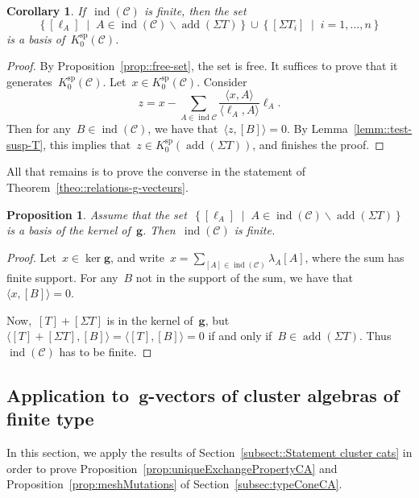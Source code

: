 \documentclass{amsart}
\newtheorem{corollary}[theorem]{Corollary}
\newtheorem{proposition}[theorem]{Proposition}
\theoremstyle{definition}
\renewcommand{\b}[1]{{\boldsymbol{#1}}} %
\newcommand{\set}[2]{\left\{ #1 \;\middle|\; #2 \right\}} %
\newcommand{\ssm}{\smallsetminus} %
\newcommand{\cat}{\mathcal{C}}
\newcommand{\susp}{\Sigma}
\newcommand{\add}{\operatorname{add}}
\newcommand{\spl}{\operatorname{sp}}
\newcommand{\Ksp}{K_0^{\spl}}
\newcommand{\ind}{\operatorname{ind}}
\begin{document}
\begin{corollary}
 If~$\ind(\cat)$ is finite, then the set
 \[
 \set{[\ell_A]}{A\in \ind(\cat) \ssm \add(\susp T)} \cup \set{[\susp T_i]}{i=1, \ldots, n}
 \]
 is a basis of~$\Ksp(\cat)$.
\end{corollary}
\begin{proof}
 By Proposition~\ref{prop::free-set}, the set is free.  It suffices to prove that it generates~$\Ksp(\cat)$.  Let~$x\in \Ksp(\cat)$.  Consider
 \[
  z = x - \sum_{A\in \ind{\cat}} \frac{\langle x, A \rangle}{\langle \ell_A, A\rangle} \ell_A.
 \]
 Then for any~$B\in \ind(\cat)$, we have that~$\langle z, [B] \rangle = 0$.  By Lemma~\ref{lemm::test-susp-T}, this implies that~$z\in \Ksp(\add(\susp T))$, and finishes the proof.
\end{proof}


All that remains is to prove the converse in the statement of Theorem~\ref{theo::relations-g-vecteurs}.

\begin{proposition}
 Assume that the set~$\set{[\ell_A]}{A\in \ind(\cat) \ssm \add(\susp T)}$ is a basis of the kernel of~$\b g$. Then~$\ind(\cat)$ is finite.
\end{proposition}
\begin{proof}
 Let~$x\in \ker \b g$, and write~$x = \sum_{[A]\in \ind(\cat)} \lambda_A[A]$, where the sum has finite support.  For any~$B$ not in the support of the sum, we have that~$\langle x, [B] \rangle = 0$.
 
 Now,~$[T]+[\susp T]$ is in the kernel of~$\b g$, but~$\langle [T] + [\susp T], [B] \rangle = \langle [T], [B] \rangle = 0$ if and only if~$B\in \add(\susp T)$.  Thus~$\ind(\cat)$ has to be finite.
\end{proof}


\subsection{Application to~$\b g$-vectors of cluster algebras of finite type}
\label{sect::applications-g-vectors}

In this section, we apply the results of Section~\ref{subsect::Statement cluster cats} in order to prove Proposition~\ref{prop:uniqueExchangePropertyCA} and Proposition~\ref{prop:meshMutations} of Section~\ref{subsec:typeConeCA}.
\end{document}
